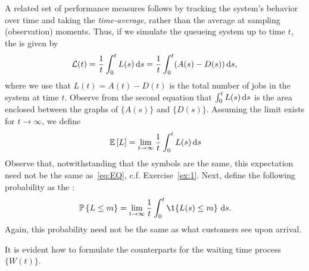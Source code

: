 A related set of performance measures follows by tracking the system's
behavior over time and taking the \emph{time-average}, rather than the
average at sampling (observation) moments. Thus, if we simulate the
queueing system up to time $t$, the  is given by
\begin{equation}\label{eq:11}
\mathcal{L}(t) = \frac 1 t\int_0^t L(s)\,\text{d}s =  \frac 1 t\int_0^t (A(s)-D(s)) \,\text{d}s,
\end{equation}
where we use that $L(t)=A(t) - D(t)$ is the total number of jobs in
the system at time $t$.  Observe from the second equation that
$\int_0^t L(s)\,\text{d}s$ is the area enclosed between the graphs of $\{A(s)\}$
and $\{D(s)\}$. Assuming the limit exists for $t\to\infty$, we define
\begin{equation}
  \label{eq:46}
  \,\mathbb{E}\left[L\right] = \lim_{t\to\infty} \frac 1 t\int_0^t L(s)\,\text{d}s 
\end{equation}
Observe that, notwithstanding that the symbols are the same, this
expectation need not be the same as~\eqref{eq:EQ},
c.f. Exercise~\ref{ex:1}. Next, define the following probability as
the :
\begin{equation}
  \label{eq:47}
  \P{L\leq m} =\lim_{t\to\infty} \frac 1 t\int_0^t \1{L(s)\leq m}\,\d s.
\end{equation}
Again, this probability need not be the same as what customers see
upon arrival.  

It is evident how to formulate the counterparts for the waiting time
process $\{W(t)\}$.




